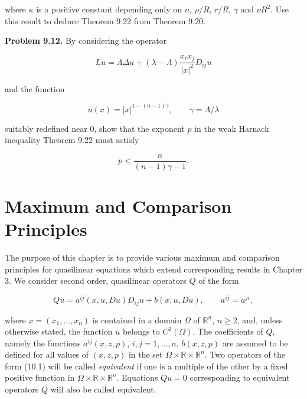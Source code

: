 
where $\kappa$ is a positive constant depending only on $n$, $\rho/R$, $r/R$, $\gamma$ and $\nu R^2$. Use this result to deduce Theorem 9.22 from Theorem 9.20.

\medskip

\noindent\textbf{Problem 9.12.} By considering the operator

\[
Lu = \Lambda \Delta u + (\lambda - \Lambda) \frac{x_i x_j}{|x|^2} D_{ij}u
\]

\noindent and the function

\[
u(x) = |x|^{1-(n-1)\gamma}, \qquad \gamma = \Lambda/\lambda
\]

\noindent suitably redefined near $0$, show that the exponent $p$ in the weak Harnack inequality Theorem 9.22 must satisfy

\[
p < \frac{n}{(n-1)\gamma - 1}.
\]




\chapter{Maximum and Comparison Principles}

The purpose of this chapter is to provide various maximum and comparison principles for quasilinear equations which extend corresponding results in Chapter 3. We consider second order, quasilinear operators $Q$ of the form

\begin{equation}
Qu=a^{ij}(x,u,Du)D_{ij}u+b(x,u,Du), \qquad a^{ij}=a^{ji},
\tag{10.1}
\end{equation}

where $x=(x_1,\dots,x_n)$ is contained in a domain $\Omega$ of $\mathbb{R}^n$, $n\ge 2$, and, unless otherwise stated, the function $u$ belongs to $C^2(\Omega)$. The coefficients of $Q$, namely the functions $a^{ij}(x,z,p)$, $i,j=1,\dots,n$, $b(x,z,p)$ are assumed to be defined for all values of $(x,z,p)$ in the set $\Omega\times\mathbb{R}\times\mathbb{R}^n$. Two operators of the form (10.1) will be called \emph{equivalent} if one is a multiple of the other by a fixed positive function in $\Omega\times\mathbb{R}\times\mathbb{R}^n$. Equations $Qu=0$ corresponding to equivalent operators $Q$ will also be called equivalent.

